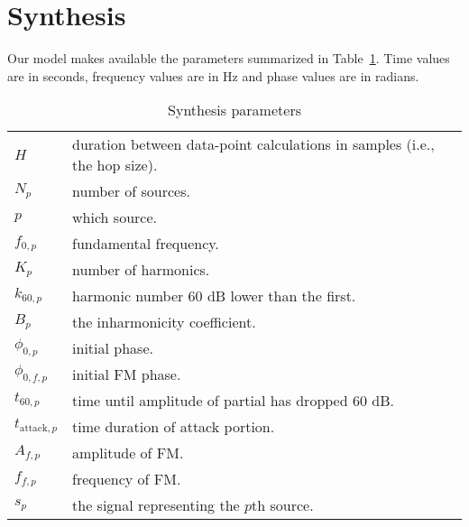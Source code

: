 \section{Synthesis}
Our model makes available the parameters summarized in
Table~\ref{tab:ex2synthparams}. Time values are in seconds,
frequency values are in Hz and phase values are in radians.
\begin{table}
    \centering
    \begin{tabular}{l l}
        $H$ & duration between data-point calculations in samples (i.e., the hop
        size). \\
        $N_{p}$ & number of sources. \\
        $p$ & which source. \\
        $f_{0,p}$ & fundamental frequency. \\
        $K_{p}$ & number of harmonics. \\
        $k_{60,p}$ & harmonic number 60 dB lower than the first. \\
        $B_{p}$ & the inharmonicity coefficient. \\
        $\phi_{0,p}$ & initial phase. \\
        $\phi_{0,f,p}$ & initial FM phase. \\
        $t_{60,p}$ & time until amplitude of partial has dropped 60 dB. \\
        $t_{\text{attack},p}$ & time duration of attack portion. \\
        $A_{f,p}$ & amplitude of FM. \\
        $f_{f,p}$ & frequency of FM. \\
        $s_{p}$ & the signal representing the $p$th source.
    \end{tabular}
    \caption{Synthesis parameters \label{tab:ex2synthparams}}
\end{table}

